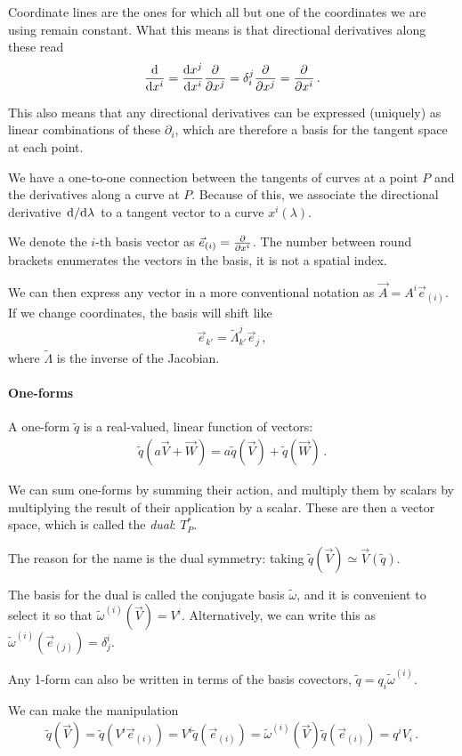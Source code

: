 \documentclass[main.tex]{subfiles}
\begin{document}
Coordinate lines are the ones for which all but one of the coordinates we are using remain constant. 
What this means is that directional derivatives along these read 
%
\begin{align}
\dv{}{x^{i}} = \dv{x^{j}}{x^{i}} \pdv{}{x^{j}} = \delta^{j}_{i} \pdv{}{x^{j}} = \pdv{}{x^{i}}
\,.
\end{align}

This also means that any directional derivatives can be expressed (uniquely) as linear combinations of these \(\partial_{i}\), which are therefore a basis for the tangent space at each point.

We have a one-to-one connection between the tangents of curves at a point \(P\) and the derivatives along a curve at \(P\). 
Because of this, we associate the directional derivative \(\dv*{}{\lambda }\) to a tangent vector to a curve \(x^{i}(\lambda )\).

We denote the \(i\)-th basis vector as \(\vec{e}_{(i)} = \pdv{}{x^{i}}\).
The number between round brackets enumerates the vectors in the basis, it is not a spatial index. 

We can then express any vector in a more conventional notation as \(\vec{A} = A^{i}\vec{e}_{(i)}\).
If we change coordinates, the basis will shift like 
%
\begin{align}
\vec{e}_{k'} = \widetilde{\Lambda}^{j}_{k'} \vec{e}_j
\,,
\end{align}
%
where \(\widetilde{\Lambda}\) is the inverse of the Jacobian. 

\paragraph{One-forms}

A one-form \(\widetilde{q}\) is a real-valued, linear function of vectors: 
%
\begin{align}
\widetilde{q}(a \vec{V} + \vec{W}) = a \widetilde{q}(\vec{V}) + \widetilde{q}(\vec{W})
\,.
\end{align}

We can sum one-forms by summing their action, and multiply them by scalars by multiplying the result of their application by a scalar. 
These are then a vector space, which is called the \emph{dual}: \(T_P^{*}\).

The reason for the name is the dual symmetry: taking \(\widetilde{q}(\vec{V}) \simeq \vec{V} (\widetilde{q})\). 

The basis for the dual is called the conjugate basis \(\widetilde{\omega}\), and it is convenient to select it so that \(\widetilde{\omega}^{(i)} (\vec{V}) = V^{i}\). 
Alternatively, we can write this as \(\widetilde{\omega}^{(i)} (\vec{e}_{(j)}) = \delta^{i}_{j}\). 

Any 1-form can also be written in terms of the basis covectors, \(\widetilde{q} = q_{i} \widetilde{\omega}^{(i)}\). 

We can make the manipulation 
%
\begin{align}
\widetilde{q} (\vec{V}) = 
\widetilde{q} (V^{i} \vec{e}_{(i)}) =
V^{i} \widetilde{q} (\vec{e}_{(i)}) =
\widetilde{\omega}^{(i)}(\vec{V}) \widetilde{q} (\vec{e}_{(i)}) = q^{i} V_i
\,.
\end{align}
%
\end{document}
